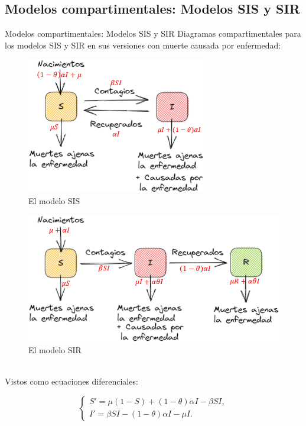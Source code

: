 \documentclass[9pt]{beamer}
\begin{document}
\subsection{Modelos compartimentales: Modelos SIS y SIR}
\begin{frame}{Modelos compartimentales: Modelos SIS y SIR}
Diagramas compartimentales para los modelos SIS y SIR en sus versiones con muerte causada por enfermedad:\\

\begin{minipage}{0.48\textwidth}
\begin{figure}[h]
  \centering
    \includegraphics[width=0.7\textwidth]{Imagenes/SIS_compartimientos.PNG}
  \caption{El modelo SIS}
  \label{fig:SIS}
\end{figure}
\end{minipage}
\hfill
\begin{minipage}{0.48\textwidth}
\begin{figure}[h]
  \centering
    \includegraphics[width=1\textwidth]{Imagenes/SIR_compartimientos.PNG}
  \caption{El modelo SIR}
  \label{fig:SIR}
\end{figure}
\end{minipage}\\
Vistos como ecuaciones diferenciales:\\
\begin{minipage}{0.48\textwidth}
\begin{equation*}\label{eq:modeloSIS}
\left\{
\begin{array}{l}
S' = \mu(1 - S) + (1 - \theta)\alpha I - \beta S I, \\
I' = \beta S I - (1 - \theta)\alpha I - \mu I.
\end{array}
\right.
\end{equation*}


\end{minipage}
\end{frame}
\end{document}

